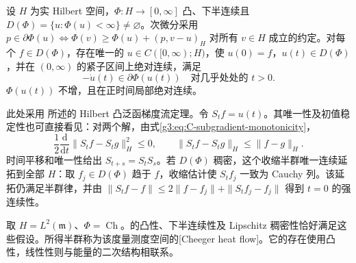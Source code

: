 \begin{theorem}\label{g3:thm:C-convex-gradient-flow}
	设 \(H\) 为实 Hilbert 空间，\(\Phi:H\to[0,\infty]\) 凸、下半连续且 \(D(\Phi)=\{u:\Phi(u)<\infty\}\ne\varnothing\)。次微分采用 \(p\in\partial\Phi(u)\iff\Phi(v)\ge\Phi(u)+(p,v-u)_H\) 对所有 \(v\in H\) 成立的约定。对每个 \(f\in D(\Phi)\)，存在唯一的 \(u\in C([0,\infty);H)\)，使 \(u(0)=f\)，\(u(t)\in D(\Phi)\)，并在 \((0,\infty)\) 的紧子区间上绝对连续，满足
	\[
		-\dot u(t)\in\partial\Phi(u(t))\quad\text{对几乎处处的 }t>0.
	\]
	\(\Phi(u(t))\) 不增，且在正时间局部绝对连续。
\end{theorem}
此处采用 \cite[第2.2节，第973页]{AmbrosioGigliSavare2013WeakGradients} 所述的 Hilbert 凸泛函梯度流定理。令 \(S_tf=u(t)\)。其唯一性及初值稳定性也可直接看见：对两个解，由式\eqref{g3:eq:C-subgradient-monotonicity}，
\[
	\frac12\frac{\mathrm d}{\mathrm dt}\|S_tf-S_tg\|_H^2\le0,
	\qquad\|S_tf-S_tg\|_H\le\|f-g\|_H.
\]
时间平移和唯一性给出 \(S_{t+s}=S_tS_s\)。若 \(D(\Phi)\) 稠密，这个收缩半群唯一连续延拓到全部 \(H\)：取 \(f_j\in D(\Phi)\) 趋于 \(f\)，收缩估计使 \(S_tf_j\) 一致为 Cauchy 列。该延拓仍满足半群律，并由
\(\|S_tf-f\|\le2\|f-f_j\|+\|S_tf_j-f_j\|\) 得到 \(t=0\) 的强连续性。

\ProseParagraphBreak
取 \(H=L^2(\mathfrak m)\)、\(\Phi=\operatorname{Ch}\)。的凸性、下半连续性及 Lipschitz 稠密性恰好满足这些假设。所得半群称为该度量测度空间的[Cheeger heat flow]。它的存在使用凸性，线性性则与能量的二次结构相联系。

